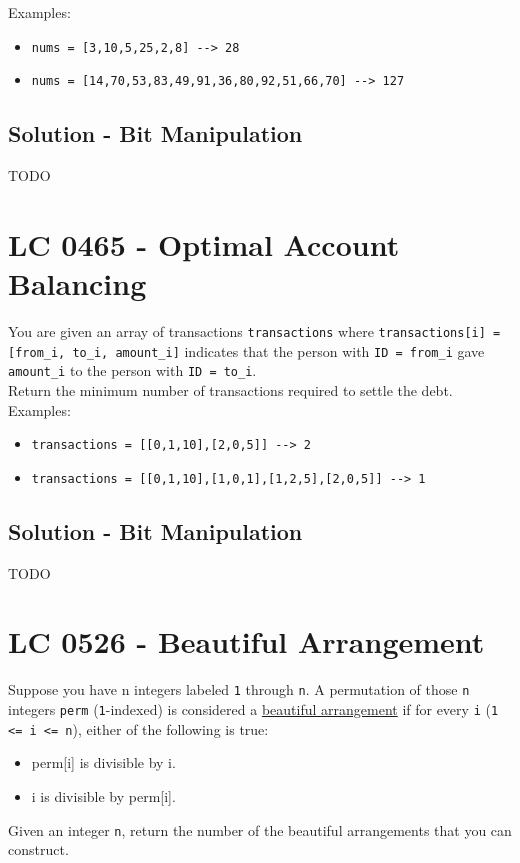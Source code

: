 Examples:
\begin{itemize}
\item {\colorbox{CodeBackground}{\lstinline|nums = [3,10,5,25,2,8] --> 28|}}
\item {\colorbox{CodeBackground}{\lstinline|nums = [14,70,53,83,49,91,36,80,92,51,66,70] --> 127|}}
\end{itemize}

\subsection*{Solution - Bit Manipulation}
TODO

\section{LC 0465 - Optimal Account Balancing}
You are given an array of transactions {\colorbox{CodeBackground}{\lstinline|transactions|}} where {\colorbox{CodeBackground}{\lstinline|transactions[i] = [from_i, to_i, amount_i]|}} indicates that the person with {\colorbox{CodeBackground}{\lstinline|ID = from_i|}} gave {\colorbox{CodeBackground}{\lstinline|amount_i|}} to the person with {\colorbox{CodeBackground}{\lstinline|ID = to_i|}}.\\

Return the minimum number of transactions required to settle the debt.\\

Examples:
\begin{itemize}
\item {\colorbox{CodeBackground}{\lstinline|transactions = [[0,1,10],[2,0,5]] --> 2|}}
\item {\colorbox{CodeBackground}{\lstinline|transactions = [[0,1,10],[1,0,1],[1,2,5],[2,0,5]] --> 1|}}
\end{itemize}

\subsection*{Solution - Bit Manipulation}
TODO

\section{LC 0526 - Beautiful Arrangement}
Suppose you have n integers labeled {\colorbox{CodeBackground}{\lstinline|1|}} through {\colorbox{CodeBackground}{\lstinline|n|}}. A permutation of those {\colorbox{CodeBackground}{\lstinline|n|}} integers {\colorbox{CodeBackground}{\lstinline|perm|}} ({\colorbox{CodeBackground}{\lstinline|1|}}-indexed) is considered a \ul{beautiful arrangement} if for every {\colorbox{CodeBackground}{\lstinline|i|}} ({\colorbox{CodeBackground}{\lstinline|1 <= i <= n|}}), either of the following is true:
\begin{itemize}
\item perm[i] is divisible by i.
\item i is divisible by perm[i].
\end{itemize}
Given an integer {\colorbox{CodeBackground}{\lstinline|n|}}, return the number of the beautiful arrangements that you can construct.\\

